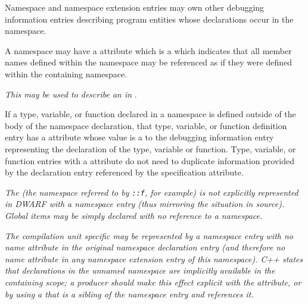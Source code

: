 Namespace and namespace extension entries may own 
other
debugging information entries describing program entities
whose declarations occur in the namespace.

A namespace may have a 
\DWATexportsymbolsDEFN{}
attribute
which is a \CLASSflag{} which
indicates that all member names defined within the 
namespace may be referenced as if they were defined within 
the containing namespace. 

\textit{This may be used to describe an  in }.

If a type, variable, or function declared in a namespace is
defined outside of the body of the namespace declaration,
that type, variable, or function definition entry has a
\DWATspecification{} attribute 
whose value is a  to the
debugging information entry representing the declaration of
the type, variable or function. Type, variable, or function
entries with a 
\DWATspecification{} attribute 
do not need
to duplicate information provided by the declaration entry
referenced by the specification attribute.

\textit{The  
(the 
namespace 
referred to by
\texttt{::f}, for example) is not explicitly represented in
DWARF with a namespace entry (thus mirroring the situation
in  source).  
Global items may be simply declared with no
reference to a namespace.}

\textit{The  
compilation unit specific  may
be represented by a namespace entry with no name attribute in
the original namespace declaration entry (and therefore no name
attribute in any namespace extension entry of this namespace).
C++ states that declarations in the unnamed namespace are
implicitly available in the containing scope; a producer
should make this effect explicit with the \DWATexportsymbols{}
attribute, or by using a \DWTAGimportedmodule{} that is a
sibling of the namespace entry and references it.}

